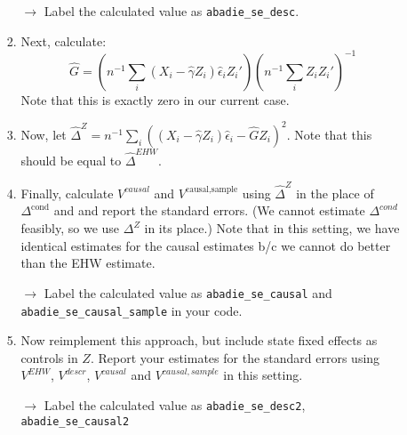 \documentclass[11pt, a4paper]{article}
\begin{document}
\begin{enumerate}
\begin{enumerate}
\begin{enumerate}
  \hspace{10pt} $\rightarrow$ Label the calculated value as \texttt{abadie\_se\_desc}.
  \item Next, calculate:
    \begin{equation}
      \hat{G} = \left( n^{-1}\sum_{i}(X_{i} - \hat{\gamma}Z_{i})\hat{\epsilon}_{i}Z_{i}'\right)\left(n^{-1}\sum_{i}Z_{i}Z_{i}'\right)^{-1}
    \end{equation}
    Note that this is exactly zero in our current case.
  \item Now, let $\hat{\Delta}^{Z} = n^{-1}\sum_{i}((X_{i} - \hat{\gamma}Z_{i})\hat{\epsilon}_{i} - \hat{G}Z_{i})^{2}$. Note that this should be equal to $\hat{\Delta}^{EHW}$. 
  \item Finally, calculate $V^{causal}$ and $V^{\textrm{causal,sample}}$ using $\hat{\Delta}^{Z}$ in the place of $\Delta^{\textrm{cond}}$ and and report the standard errors. (We cannot estimate $\Delta^{cond}$ feasibly, so we use $\Delta^{Z}$ in its place.) Note that in this setting, we have identical estimates for the causal estimates b/c we cannot do better than the EHW estimate.

  \hspace{10pt} $\rightarrow$ Label the calculated value as \texttt{abadie\_se\_causal} and  \texttt{abadie\_se\_causal\_sample} in your code.
  \item Now reimplement this approach, but include state fixed effects as controls in $Z$. Report your estimates for the standard errors using $V^{EHW}$, $V^{descr}$, $V^{causal}$ and $V^{causal,sample}$ in this setting.

  \hspace{10pt} $\rightarrow$ Label the calculated value as \texttt{abadie\_se\_desc2}, \texttt{abadie\_se\_causal2} 
  

\end{enumerate}
\end{enumerate}
\end{enumerate}
\end{document}
